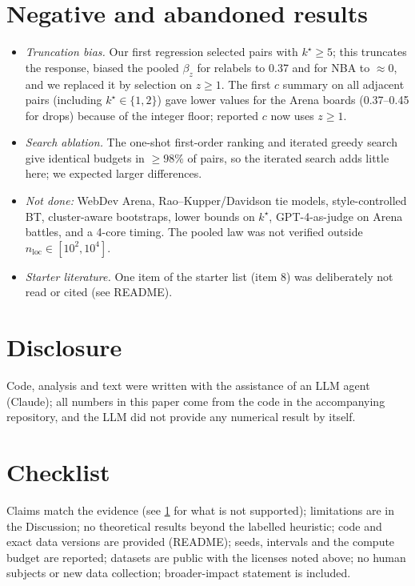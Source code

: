 \documentclass{article}
\theoremstyle{plain}
\theoremstyle{remark}
\newcommand{\nloc}{n_{\mathrm{loc}}}
\newcommand{\kstar}{k^\star}
\begin{document}
\section{Negative and abandoned results}\label{app:negative}
\begin{itemize}\setlength\itemsep{0pt}
\item \emph{Truncation bias.} Our first regression selected pairs with $\kstar\ge5$; this truncates the response, biased the pooled $\beta_z$ for relabels to 0.37 and for NBA to $\approx0$, and we replaced it by selection on $z\ge1$. The first $c$ summary on all adjacent pairs (including $\kstar\in\{1,2\}$) gave lower values for the Arena boards (0.37--0.45 for drops) because of the integer floor; reported $c$ now uses $z\ge1$.
\item \emph{Search ablation.} The one-shot first-order ranking and iterated greedy search give identical budgets in $\ge98\%$ of pairs, so the iterated search adds little here; we expected larger differences.
\item \emph{Not done:} WebDev Arena, Rao--Kupper/Davidson tie models, style-controlled BT, cluster-aware bootstraps, lower bounds on $\kstar$, GPT-4-as-judge on Arena battles, and a 4-core timing. The pooled law was not verified outside $\nloc\in[10^2,10^4]$.
\item \emph{Starter literature.} One item of the starter list (item 8) was deliberately not read or cited (see README).
\end{itemize}

\section{Disclosure}
Code, analysis and text were written with the assistance of an LLM agent (Claude); all numbers in this paper come from the code in the accompanying repository, and the LLM did not provide any numerical result by itself.

\section{Checklist}
Claims match the evidence (see \cref{app:negative} for what is not supported); limitations are in the Discussion; no theoretical results beyond the labelled heuristic; code and exact data versions are provided (README); seeds, intervals and the compute budget are reported; datasets are public with the licenses noted above; no human subjects or new data collection; broader-impact statement is included.
\end{document}
